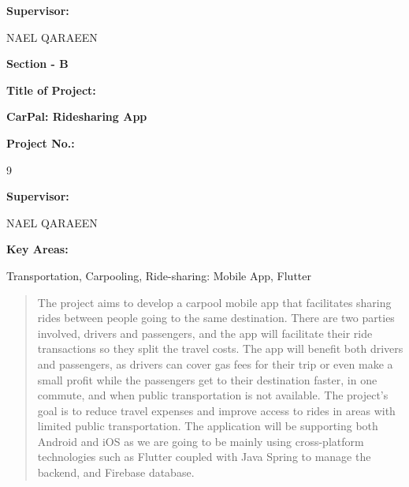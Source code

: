 \documentclass[a4paper, 12pt]{article} %
\begin{document}
\begin{titlepage}
            \vspace{0.8cm}

            \textbf{\large{Supervisor:}}
            \vspace{0.4cm}
            
            \hspace{\parindent} NAEL QARAEEN %

            \pagebreak

            \begin{center}
                \textbf{\large{Section - B}}
                \vspace{0.8cm}
                
                \textbf{\large{Title of Project:}}
                \vspace{0.4cm}
            
                \textbf{\Large{CarPal: Ridesharing App}}
                \vspace{0.8cm}

                \textbf{\large{Project No.:}}
                \vspace{0.4cm}
                
                9
                \vspace{0.8cm}

                \textbf{\large{Supervisor:}}
                \vspace{0.4cm}
            
                NAEL QARAEEN
                \vspace{0.8cm}


                \textbf{\large{Key Areas:}}
                \vspace{0.4cm}

                Transportation, Carpooling, Ride-sharing:  Mobile App, Flutter

            \end{center}
    \end{titlepage}

    \begin{abstract}
        The project aims to develop a carpool mobile app that facilitates sharing rides between people going to the same destination. There are two parties involved, drivers and passengers, and the app will facilitate their ride transactions so they split the travel costs. The app will benefit both drivers and passengers, as drivers can cover gas fees for their trip or even make a small profit while the passengers get to their destination faster, in one commute, and when public transportation is not available. The project's goal is to reduce travel expenses and improve access to rides in areas with limited public transportation. The application will be supporting both Android and iOS as we are going to be mainly using cross-platform technologies such as Flutter coupled with Java Spring to manage the backend, and Firebase database.
    \end{abstract}
    \pagebreak
    \tableofcontents
    \pagebreak
    \listoffigures
    \pagebreak
    \listoftables
    \pagebreak
    \setcounter{page}{1}
\end{document}
